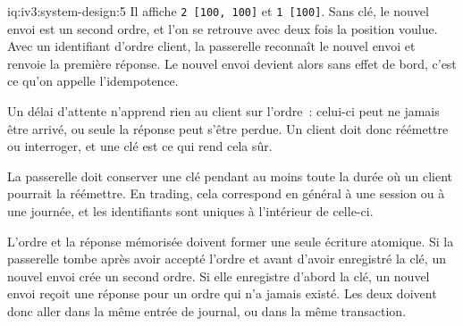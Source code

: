 \begin{solution}{iq:iv3:system-design:5}
Il affiche \texttt{2 [100, 100]} et \texttt{1 [100]}. Sans clé, le nouvel envoi est un second ordre, et l'on se retrouve avec deux fois la position voulue. Avec un identifiant d'ordre client, la passerelle reconnaît le nouvel envoi et renvoie la première réponse. Le nouvel envoi devient alors sans effet de bord, c'est ce qu'on appelle l'idempotence.

Un délai d'attente n'apprend rien au client sur l'ordre~: celui-ci peut ne jamais être arrivé, ou seule la réponse peut s'être perdue. Un client doit donc réémettre ou interroger, et une clé est ce qui rend cela sûr.

La passerelle doit conserver une clé pendant au moins toute la durée où un client pourrait la réémettre. En trading, cela correspond en général à une session ou à une journée, et les identifiants sont uniques à l'intérieur de celle-ci.

L'ordre et la réponse mémorisée doivent former une seule écriture atomique. Si la passerelle tombe après avoir accepté l'ordre et avant d'avoir enregistré la clé, un nouvel envoi crée un second ordre. Si elle enregistre d'abord la clé, un nouvel envoi reçoit une réponse pour un ordre qui n'a jamais existé. Les deux doivent donc aller dans la même entrée de journal, ou dans la même transaction.

\end{solution}

